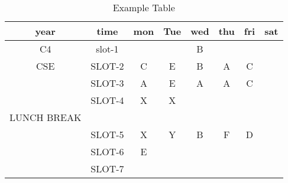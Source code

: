 \documentclass{article}
\begin{document}
\begin{table}[h]
\begin{tabular}{|c|c|c|c|c|c|c|c|}
\hline
\textbf{year} &\textbf{time}& \textbf{mon}
& \textbf{Tue }&\textbf{wed} & \textbf{thu} & \textbf{fri }&\textbf{sat} \\  
\hline
C4 & slot-1 &  & & \cellcolor{red}B& & & \\
\hline
CSE & SLOT-2& \cellcolor{orange}C&\cellcolor{yellow} E& \cellcolor{orange} B&\cellcolor{yellow}A&\cellcolor{blue} C&\\
\hline
&SLOT-3 &\cellcolor{pink} A& \cellcolor{orange}E& \cellcolor{pink}A&\cellcolor{red} A& \cellcolor{green}C & \\
\hline
     & SLOT-4 & \cellcolor{green} X & \cellcolor{red} X& &  & & \\
\hline
                                 LUNCH BREAK  \\
    \hline
 
&SLOT-5 & \cellcolor{blue}X &\cellcolor{green}  Y& \cellcolor{pink} \cellcolor{orange} B & \cellcolor{yellow}  F& \cellcolor{red} D &\\
\hline
&SLOT-6 & \cellcolor{pink} E& && & &  \\
\hline
&SLOT-7&& && && \\
\hline
\end{tabular}
\caption{Example Table}
\label{tab:example}
\end{table}
\end{document}
